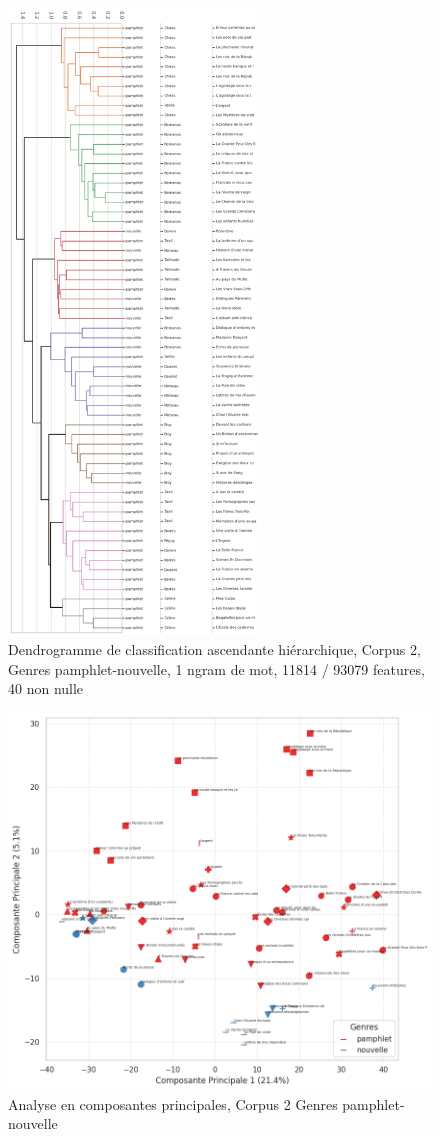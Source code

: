 \begin{figure}[H]
\centering %
\includegraphics[width=0.60\textwidth]{img/dendogram-corpus-2-PamNouvelle.png}
\caption{Dendrogramme de classification ascendante hiérarchique, Corpus 2, Genres pamphlet-nouvelle, 1 ngram de mot, 11814 / 93079 features, 40 non nulle}
\label{'fig:dendogram-corpus-2-PamNouvelle'}
\end{figure}


\begin{figure}[H]
\centering %
\includegraphics[width=1\textwidth]{img/ACP-corpus-2-PamNouvelle.png}
\caption{Analyse en composantes principales, Corpus 2 Genres pamphlet-nouvelle}
\label{'fig:ACP-corpus-2-PamNouvelle'}
\end{figure}